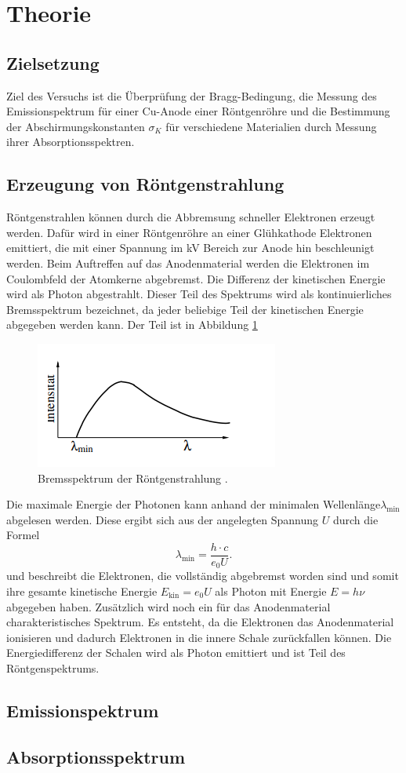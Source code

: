 \section{Theorie}
\label{sec:Theorie}
\subsection{Zielsetzung}
Ziel des Versuchs ist die Überprüfung der Bragg-Bedingung, die Messung des Emissionspektrum für einer Cu-Anode
einer Röntgenröhre und die Bestimmung der Abschirmungskonstanten $\sigma_K$ für verschiedene Materialien durch Messung ihrer Absorptionsspektren.
\subsection{Erzeugung von Röntgenstrahlung}
Röntgenstrahlen können durch die Abbremsung schneller Elektronen erzeugt werden. Dafür wird in einer Röntgenröhre an einer
Glühkathode Elektronen emittiert, die mit einer Spannung im kV Bereich zur Anode hin beschleunigt werden. Beim Auftreffen auf das Anodenmaterial werden 
die Elektronen im Coulombfeld der Atomkerne abgebremst. Die Differenz der kinetischen Energie wird als Photon abgestrahlt. Dieser Teil des Spektrums wird als kontinuierliches 
Bremsspektrum bezeichnet, da jeder beliebige Teil der kinetischen Energie abgegeben werden kann. Der Teil ist in Abbildung \ref{fig:Brems}
\begin{figure}[H]
    \centering
    \includegraphics[scale=1.5]{content/Bremsspektrum.png}
    \caption{Bremsspektrum der Röntgenstrahlung \cite{sample}.}
    \label{fig:Brems}
\end{figure}
Die maximale Energie der Photonen kann anhand der minimalen Wellenlänge$\lambda_\text{min}$ abgelesen werden. Diese ergibt sich aus der angelegten Spannung $U$
durch die Formel
\begin{equation}
    \lambda_\text{min}=\frac{h\cdot c}{e_0U}.
    \label{eq:minWelle}
\end{equation}
und beschreibt die Elektronen, die vollständig abgebremst worden sind und somit ihre gesamte kinetische Energie $E_\text{kin}=e_0U$ als Photon mit Energie $E=h\nu$ abgegeben haben.
Zusätzlich wird noch ein für das Anodenmaterial charakteristisches Spektrum. Es entsteht, da die Elektronen das Anodenmaterial ionisieren und dadurch
Elektronen in die innere Schale zurückfallen können. Die Energiedifferenz der Schalen wird als Photon emittiert und ist Teil des Röntgenspektrums.
\subsection{Emissionspektrum}

\subsection{Absorptionsspektrum}
\cite{sample}
